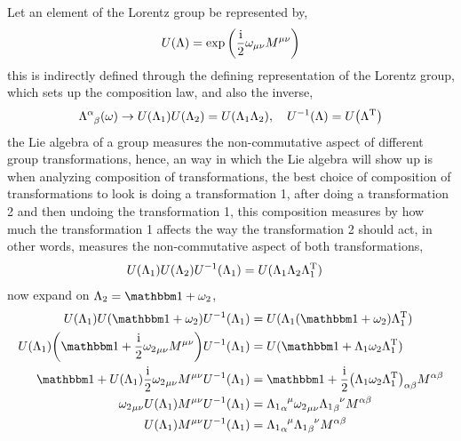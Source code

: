 \problem{}
\probitem{}

Let an element of the Lorentz group be represented by, \begin{align}U\qty(\Lambda) = \exp\qty(\frac{\textnormal{i}} 2\omega_{\mu\nu}M^{\mu\nu})\end{align} this is indirectly defined through 
the defining representation of the Lorentz group, which sets up the composition law, and also the inverse, 
\begin{align}
    \tensor{\Lambda}{^\alpha_\beta}\qty(\omega)\rightarrow U\qty(\Lambda_1) U\qty(\Lambda_2) = U(\Lambda_1\Lambda_2),\ \ \ U^{-1}(\Lambda)= U\qty(\Lambda^{\textnormal T}) %
\end{align} 
the Lie algebra of a group measures the non-commutative aspect of different group transformations, hence, an way in which the Lie algebra will show up is 
when analyzing composition of transformations, the best choice of composition of transformations to look is doing a transformation 1, after doing a transformation 2 and then 
undoing the transformation 1, this composition measures by how much the transformation 1 affects the way the transformation 2 should act, in other words, measures the non-commutative 
aspect of both transformations,
\begin{align}
    U\qty(\Lambda_1)U\qty(\Lambda_2)U^{-1}\qty(\Lambda_1) &=U(\Lambda_1\Lambda_2 \Lambda_1^{\textnormal T})
\end{align}
now expand on $\Lambda_2=\mathbbm 1+\omega_2$,
\begin{align}
    U\qty(\Lambda_1)U\qty(\mathbbm 1+\omega_2)U^{-1}\qty(\Lambda_1) &=U(\Lambda_1 \qty(\mathbbm 1+\omega_2) \Lambda_1^{\textnormal T})\\
    U\qty(\Lambda_1)\qty(\mathbbm 1+\frac\im 2{\omega_2}_{\mu\nu}M^{\mu\nu})U^{-1}\qty(\Lambda_1) &=U(\mathbbm 1+\Lambda_1 \omega_2 \Lambda_1^{\textnormal T})\\
    \mathbbm 1+U\qty(\Lambda_1)\frac\im 2{\omega_2}_{\mu\nu}M^{\mu\nu}U^{-1}\qty(\Lambda_1) &=\mathbbm 1 +\frac\im 2\tensor{\qty(\Lambda_1 \omega_2 \Lambda_1^{\textnormal T})}{_\alpha_\beta}M^{\alpha\beta}\\
    {\omega_2}_{\mu\nu}U\qty(\Lambda_1)M^{\mu\nu}U^{-1}\qty(\Lambda_1) &=\tensor{{\Lambda_1}}{_\alpha^\mu}\tensor{{\omega_2}}{_\mu_\nu}\tensor{{\Lambda_1}}{_\beta^\nu}M^{\alpha\beta}\\
    U\qty(\Lambda_1)M^{\mu\nu}U^{-1}\qty(\Lambda_1) &=\tensor{{\Lambda_1}}{_\alpha^\mu}\tensor{{\Lambda_1}}{_\beta^\nu}M^{\alpha\beta}
\end{align}
